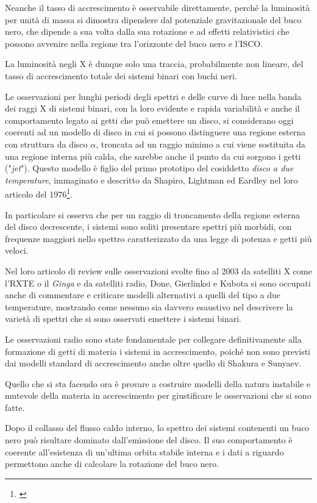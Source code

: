 \documentclass[a4paperbi]{article}
\begin{document}
	Neanche il tasso di accrescimento è osservabile direttamente, perché la luminosità per unità di massa si dimostra dipendere dal potenziale gravitazionale del buco nero, che dipende a sua volta dalla sua rotazione e ad effetti relativistici che possono avvenire nella regione tra l'orizzonte del buco nero e l'ISCO.
	
	La luminosità negli X è dunque solo una traccia, probabilmente non lineare, del tasso di accrescimento totale dei sistemi binari con buchi neri.

	Le osservazioni per lunghi periodi degli spettri e delle curve di luce nella banda dei raggi X di sistemi binari, con la loro evidente e rapida variabilità e anche il comportamento legato ai getti che può emettere un disco, si considerano oggi coerenti ad un modello di disco in cui si possono distinguere una regione esterna con struttura da disco $\alpha$, troncata ad un raggio minimo a cui viene sostituita da una regione interna più calda, che sarebbe anche il punto da cui sorgono i getti ("\textit{jet}"). Questo modello è figlio del primo prototipo del cosiddetto \textit{disco a due temperature}, immaginato e descritto da Shapiro, Lightman ed Eardley nel loro articolo del 1976\footnote{\cite{ShapiroLightmanEardley1976}}.
	
	In particolare si osserva che per un raggio di troncamento della regione esterna del disco decrescente, i sistemi sono soliti presentare spettri più morbidi, con frequenze maggiori nello spettro caratterizzato da una legge di potenza e getti più veloci.
	
	Nel loro articolo di review sulle osservazioni svolte fino al 2003 da satelliti X come l'RXTE o il \textit{Ginga} e da satelliti radio, Done, Gierlinksi e Kubota si sono occupati anche di commentare e criticare modelli alternativi a quelli del tipo a due temperature, mostrando come nessuno sia davvero esaustivo nel descrivere la varietà di spettri che si sono osservati emettere i sistemi binari.
	
	Le osservazioni radio sono state fondamentale per collegare definitivamente alla formazione di getti di materia i sistemi in accrescimento, poiché non sono previsti dai modelli standard di accrescimento anche oltre quello di Shakura e Sunyaev.

	Quello che si sta facendo ora è provare a costruire modelli della natura instabile e mutevole della materia in accrescimento per giustificare le osservazioni che si sono fatte.	
	
	Dopo il collasso del flusso caldo interno, lo spettro dei sistemi contenenti un buco nero può risultare dominato dall'emissione del disco. Il suo comportamento è coerente all'esistenza di un'ultima orbita stabile interna e i dati a riguardo permettono anche di calcolare la rotazione del buco nero.
	
\end{document}
